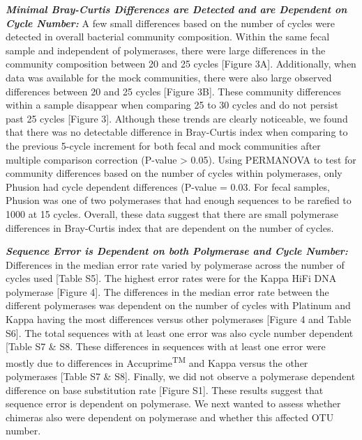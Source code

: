 \documentclass[12pt,]{article}
\begin{document}
\textbf{\emph{Minimal Bray-Curtis Differences are Detected and are
Dependent on Cycle Number:}} A few small differences based on the number
of cycles were detected in overall bacterial community composition.
Within the same fecal sample and independent of polymerases, there were
large differences in the community composition between 20 and 25 cycles
{[}Figure 3A{]}. Additionally, when data was available for the mock
communities, there were also large observed differences between 20 and
25 cycles {[}Figure 3B{]}. These community differences within a sample
disappear when comparing 25 to 30 cycles and do not persist past 25
cycles {[}Figure 3{]}. Although these trends are clearly noticeable, we
found that there was no detectable difference in Bray-Curtis index when
comparing to the previous 5-cycle increment for both fecal and mock
communities after multiple comparison correction (P-value \textgreater{}
0.05). Using PERMANOVA to test for community differences based on the
number of cycles within polymerases, only Phusion had cycle dependent
differences (P-value = 0.03. For fecal samples, Phusion was one of two
polymerases that had enough sequences to be rarefied to 1000 at 15
cycles. Overall, these data suggest that there are small polymerase
differences in Bray-Curtis index that are dependent on the number of
cycles.

\textbf{\emph{Sequence Error is Dependent on both Polymerase and Cycle
Number:}} Differences in the median error rate varied by polymerase
across the number of cycles used {[}Table S5{]}. The highest error rates
were for the Kappa HiFi DNA polymerase {[}Figure 4{]}. The differences
in the median error rate between the different polymerases was dependent
on the number of cycles with Platinum and Kappa having the most
differences versus other polymerases {[}Figure 4 and Table S6{]}. The
total sequences with at least one error was also cycle number dependent
{[}Table S7 \& S8. These differences in sequences with at least one
error were mostly due to differences in Accuprime\textsuperscript{TM}
and Kappa versus the other polymerases {[}Table S7 \& S8{]}. Finally, we
did not observe a polymerase dependent difference on base substitution
rate {[}Figure S1{]}. These results suggest that sequence error is
dependent on polymerase. We next wanted to assess whether chimeras also
were dependent on polymerase and whether this affected OTU number.
\end{document}
